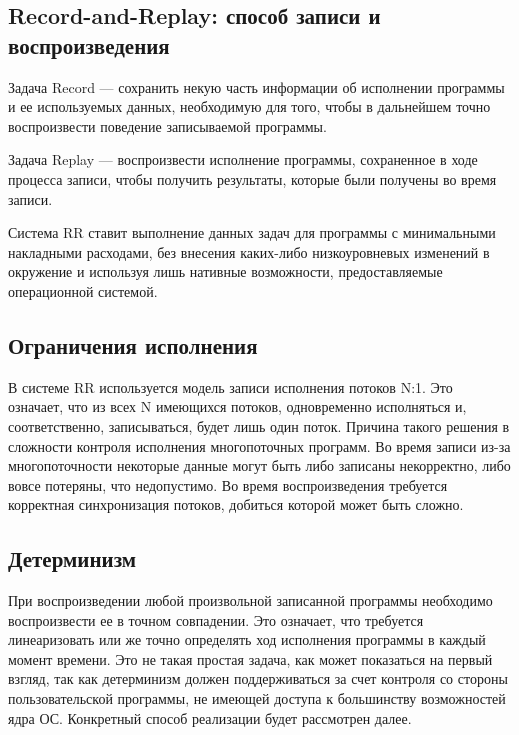 \subsection{Record-and-Replay: способ записи и воспроизведения}

Задача Record — 
сохранить некую часть информации об исполнении программы и ее используемых данных, 
необходимую для того, чтобы в дальнейшем 
точно воспроизвести поведение записываемой программы.

Задача Replay — 
воспроизвести исполнение программы, сохраненное в ходе процесса записи, 
чтобы получить результаты, которые были получены во время записи.

Система RR ставит выполнение данных задач для программы 
с минимальными накладными расходами, без внесения каких-либо низкоуровневых изменений в 
окружение и используя лишь нативные возможности, предоставляемые операционной системой.

\subsection{Ограничения исполнения}

В системе RR используется модель записи исполнения потоков N:1. Это означает, 
что из всех N имеющихся потоков, одновременно исполняться и, соответственно, записываться, будет лишь один поток.
Причина такого решения в сложности 
контроля исполнения многопоточных программ. Во время записи из-за многопоточности некоторые данные могут быть либо записаны некорректно, 
либо вовсе потеряны, что недопустимо. Во время воспроизведения требуется корректная синхронизация потоков, 
добиться которой может быть сложно.


\subsection{Детерминизм}

При воспроизведении любой произвольной записанной программы необходимо воспроизвести ее в точном совпадении. 
Это означает, что требуется линеаризовать или же точно определять ход исполнения программы в каждый момент времени.
Это не такая простая задача, как может показаться на первый взгляд, 
так как детерминизм должен поддерживаться за счет контроля со стороны пользовательской программы, 
не имеющей доступа к большинству возможностей ядра ОС.
Конкретный способ реализации будет рассмотрен далее.

